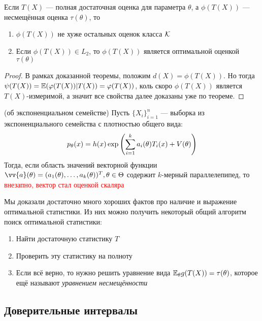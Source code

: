 \begin{corollary}
	Если $T(X)$ --- полная достаточная оценка для параметра $\theta$, а $\phi(T(X))$ --- несмещённая оценка $\tau(\theta)$, то
	\begin{enumerate}
		\item $\phi(T(X))$ не хуже остальных оценок класса $\mathcal{K}$
		
		\item Если $\phi(T(X)) \in L_2$, то $\phi(T(X))$ является оптимальной оценкой $\tau(\theta)$
	\end{enumerate}
\end{corollary}

\begin{proof}
	В рамках доказанной теоремы, положим $d(X) = \phi(T(X))$. Но тогда $\psi(T(X)) = \mathbb{E}(\varphi(T(X)) | T(X)) = \varphi(T(X))$, коль скоро $\phi(T(X))$ является $T(X)$-измеримой, а значит все свойства далее доказаны уже по теореме.
\end{proof}

\begin{theorem} (об экспоненциальном семействе)
	Пусть $\{X_i\}_{i = 1}^n$ --- выборка из экспоненциального семейства с плотностью общего вида:
	\[
		p_\theta(x) = h(x)\exp\left(\sum_{i = 1}^k a_i(\theta)T_i(x) + V(\theta)\right)
	\]
	Тогда, если область значений векторной функции $\vv{a}(\theta) = (a_1(\theta), \ldots, a_k(\theta))^T, \theta \in \Theta$ содержит $k$-мерный параллелепипед, то \textcolor{red}{внезапно, вектор стал оценкой скаляра}
\end{theorem}

\begin{note}
	Мы доказали достаточно много хороших фактов про наличие и выражение оптимальной статистики. Из них можно получить некоторый общий алгоритм поиск оптимальной статистики:
	\begin{enumerate}
		\item Найти достаточную статистику $T$
		
		\item Проверить эту статистику на полноту
		
		\item Если всё верно, то нужно решить уравнение вида $\mathbb{E}_\theta g(T(X)) = \tau(\theta)$, которое ещё называют \textit{уравнением несмещённости}
	\end{enumerate}
\end{note}

\subsection{Доверительные интервалы}

